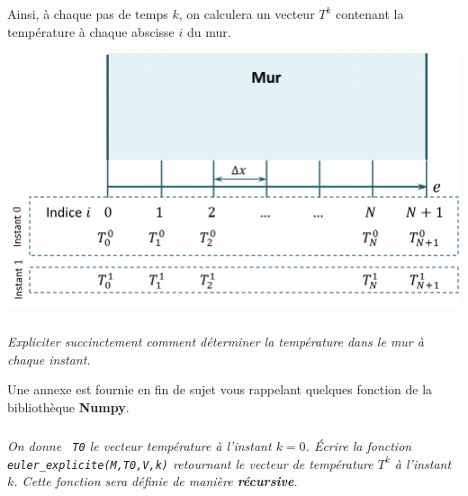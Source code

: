 \vspace{.5cm}
Ainsi, à chaque pas de temps $k$, on calculera un vecteur $T^k$ contenant la température à chaque abscisse $i$ du mur.

\begin{center}
\includegraphics[width=0.5\linewidth]{images/figure_03}
\end{center}

\subparagraph{}
\textit{Expliciter succinctement comment déterminer la température dans le mur à chaque instant.}



\vspace{.5cm}

\noindent
Une annexe est fournie en fin de sujet vous rappelant quelques fonction de la bibliothèque \textbf{Numpy}.

\subparagraph{}
\textit{On donne \texttt{ T0} le vecteur température à l'instant $k=0$. 
Écrire la fonction \texttt{euler\_explicite(M,T0,V,k)} retournant le vecteur de température 
$T^k$ à l'instant $k$. Cette fonction sera définie de manière \textbf{récursive}.}\\
\fi


